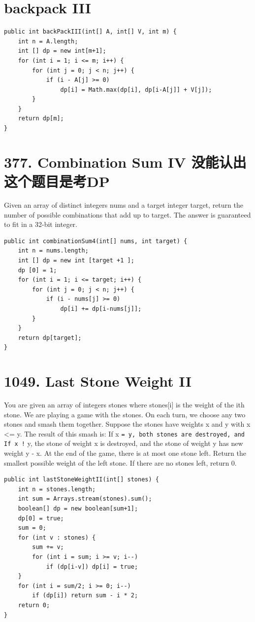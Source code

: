 \documentclass[9pt, b5paaper]{book}
\begin{document}
\section{backpack III}
\label{sec-2-25}
\begin{verbatim}
public int backPackIII(int[] A, int[] V, int m) {
    int n = A.length;
    int [] dp = new int[m+1];
    for (int i = 1; i <= m; i++) {
        for (int j = 0; j < n; j++) {
            if (i - A[j] >= 0)
                dp[i] = Math.max(dp[i], dp[i-A[j]] + V[j]);
        }
    }
    return dp[m];
}
\end{verbatim}

\section{377. Combination Sum IV 没能认出这个题目是考DP}
\label{sec-2-26}
Given an array of distinct integers nums and a target integer target, return the number of possible combinations that add up to target.
The answer is guaranteed to fit in a 32-bit integer.
\begin{verbatim}
public int combinationSum4(int[] nums, int target) {
    int n = nums.length;
    int [] dp = new int [target +1 ];
    dp [0] = 1;
    for (int i = 1; i <= target; i++) {
        for (int j = 0; j < n; j++) {
            if (i - nums[j] >= 0)
                dp[i] += dp[i-nums[j]];
        }
    }
    return dp[target];
}
\end{verbatim}

\section{1049. Last Stone Weight II}
\label{sec-2-27}
You are given an array of integers stones where stones[i] is the weight of the ith stone.
We are playing a game with the stones. On each turn, we choose any two stones and smash them together. Suppose the stones have weights x and y with x <= y. The result of this smash is:
If x \texttt{= y, both stones are destroyed, and
If x !} y, the stone of weight x is destroyed, and the stone of weight y has new weight y - x.
At the end of the game, there is at most one stone left.
Return the smallest possible weight of the left stone. If there are no stones left, return 0.
\begin{verbatim}
public int lastStoneWeightII(int[] stones) {
    int n = stones.length;
    int sum = Arrays.stream(stones).sum();
    boolean[] dp = new boolean[sum+1];
    dp[0] = true;
    sum = 0;
    for (int v : stones) {
        sum += v;
        for (int i = sum; i >= v; i--) 
            if (dp[i-v]) dp[i] = true;
    }
    for (int i = sum/2; i >= 0; i--) 
        if (dp[i]) return sum - i * 2;
    return 0;
}
\end{verbatim}
\end{document}
